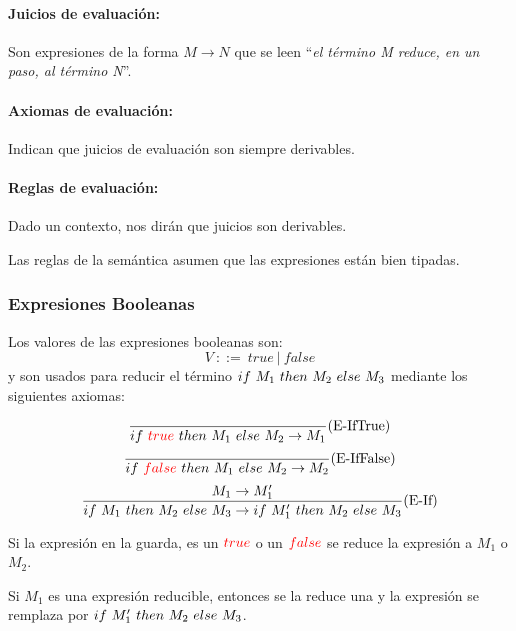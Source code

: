 \paragraph{Juicios de evaluación:} Son expresiones de la forma $M\to N$ que se leen ``\textit{el término M reduce, en un paso, al término N}''.

\paragraph{Axiomas de evaluación:} Indican que juicios de evaluación son siempre derivables.

\paragraph{Reglas de evaluación:} Dado un contexto, nos dirán que juicios son derivables.

Las reglas de la semántica asumen que las expresiones están bien tipadas.

\subsubsection{Expresiones Booleanas}\label{calculo_lambda:semantica:booleanas}
Los valores de las  expresiones booleanas son:
$$ V~::=~true~|~false$$
y son usados para reducir el término $if~ M_1~ then~ M_2~ else~ M_3$ mediante los siguientes axiomas:

\begin{equation*}
	\frac{}{if~ \color{red}true\color{black}~ then~ M_1~ else~ M_2 \to M_1}(\text{E-IfTrue})
\end{equation*}
\vspace*{5mm}
\begin{equation*}
	\frac{}{if~ \color{red}false\color{black}~ then~ M_1~ else~ M_2 \to M_2}(\text{E-IfFalse})
\end{equation*}
\vspace*{5mm}
\begin{equation*}
	\frac{M_1\to M'_1}{if~ M_1~ then~ M_2~ else~ M_3\to if~ M'_1~ then~ M_2~ else~ M_3}(\text{E-If})
\end{equation*}

\vspace*{5mm}

Si la expresión en la guarda, es un $\color{red}true\color{black}$ o un $\color{red}false\color{black}$ se reduce la expresión a $M_1$ o $M_2$.

Si $M_1$ es una expresión reducible, entonces se la reduce una y la expresión se remplaza por $if~ M'_1~ then~ M_2~ else~ M_3$.

